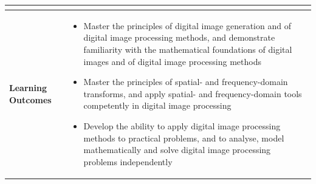 \documentclass{article}
\begin{document}
\begin{longtable}{|p{3cm}|p{10cm}|}
\begin{itemize}
\end{itemize}\\
\hline
\textbf{Learning Outcomes} & 
    \begin{itemize}
        \item Master the principles of digital image generation and of digital image processing methods, and demonstrate familiarity with
        the mathematical foundations of digital images and of digital image processing methods
        \item Master the principles of spatial- and frequency-domain transforms, and apply spatial- and frequency-domain tools competently
        in digital image processing
        \item Develop the ability to apply digital image processing methods to practical problems, and to analyse, model mathematically and
        solve digital image processing problems independently
    \end{itemize} \\
\hline
\end{longtable}
\end{document}
